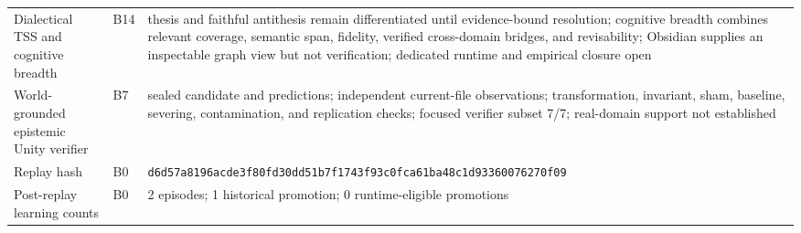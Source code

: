 \documentclass[10pt,twocolumn]{article}
\theoremstyle{definition}
\theoremstyle{plain}
\theoremstyle{remark}
\newcommand{\file}[1]{\nolinkurl{#1}}
\newcommand{\baseline}{\textsf{B0}}
\newcommand{\epistemicunity}{\textsf{B7}}
\newcommand{\dialecticrevision}{\textsf{B14}}
\begin{document}
\begin{table}[!t]
\begin{tabularx}{\textwidth}{@{}p{}p{}X@{}}
Dialectical TSS and cognitive breadth & \dialecticrevision & thesis and faithful antithesis remain differentiated until evidence-bound resolution; cognitive breadth combines relevant coverage, semantic span, fidelity, verified cross-domain bridges, and revisability; Obsidian supplies an inspectable graph view but not verification; dedicated runtime and empirical closure open \\
World-grounded epistemic Unity verifier & \epistemicunity & sealed candidate and predictions; independent current-file observations; transformation, invariant, sham, baseline, severing, contamination, and replication checks; focused verifier subset 7/7; real-domain support not established \\
Replay hash & \baseline & \scriptsize\file{d6d57a8196acde3f80fd30dd51b7f1743f93c0fca61ba48c1d93360076270f09} \\
Post-replay learning counts & \baseline & 2 episodes; 1 historical promotion; 0 runtime-eligible promotions \\
\bottomrule
\end{tabularx}
\end{table}
\end{document}
